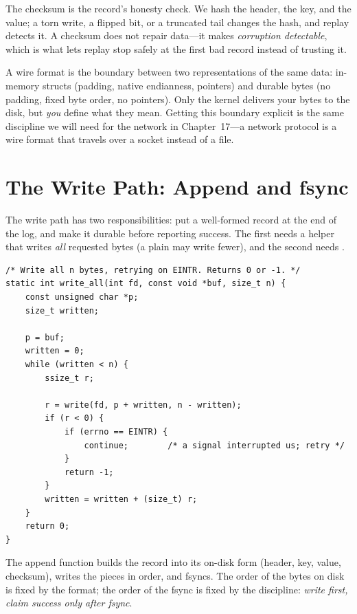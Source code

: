 The checksum is the record's honesty check. We hash the header, the
key, and the value; a torn write, a flipped bit, or a truncated tail
changes the hash, and replay detects it. A checksum does not repair
data---it makes \emph{corruption detectable}, which is what lets
replay stop safely at the first bad record instead of trusting it.

\begin{osconcept}
A wire format is the boundary between two representations of the same
data: in-memory structs (padding, native endianness, pointers) and
durable bytes (no padding, fixed byte order, no pointers). Only the
kernel delivers your bytes to the disk, but \emph{you} define what
they mean. Getting this boundary explicit is the same discipline we
will need for the network in Chapter~17---a network protocol is a wire
format that travels over a socket instead of a file.
\end{osconcept}

\section{The Write Path: Append and fsync}

The write path has two responsibilities: put a well-formed record at
the end of the log, and make it durable before reporting success. The
first needs a helper that writes \emph{all} requested bytes (a plain
 may write fewer), and the second needs .

\begin{lstlisting}[caption={write\_all: loop until every byte is written.}]
/* Write all n bytes, retrying on EINTR. Returns 0 or -1. */
static int write_all(int fd, const void *buf, size_t n) {
    const unsigned char *p;
    size_t written;

    p = buf;
    written = 0;
    while (written < n) {
        ssize_t r;

        r = write(fd, p + written, n - written);
        if (r < 0) {
            if (errno == EINTR) {
                continue;        /* a signal interrupted us; retry */
            }
            return -1;
        }
        written = written + (size_t) r;
    }
    return 0;
}
\end{lstlisting}

The append function builds the record into its on-disk form (header,
key, value, checksum), writes the pieces in order, and fsyncs. The
order of the bytes on disk is fixed by the format; the order of the
fsync is fixed by the discipline: \emph{write first, claim success
only after fsync}.

